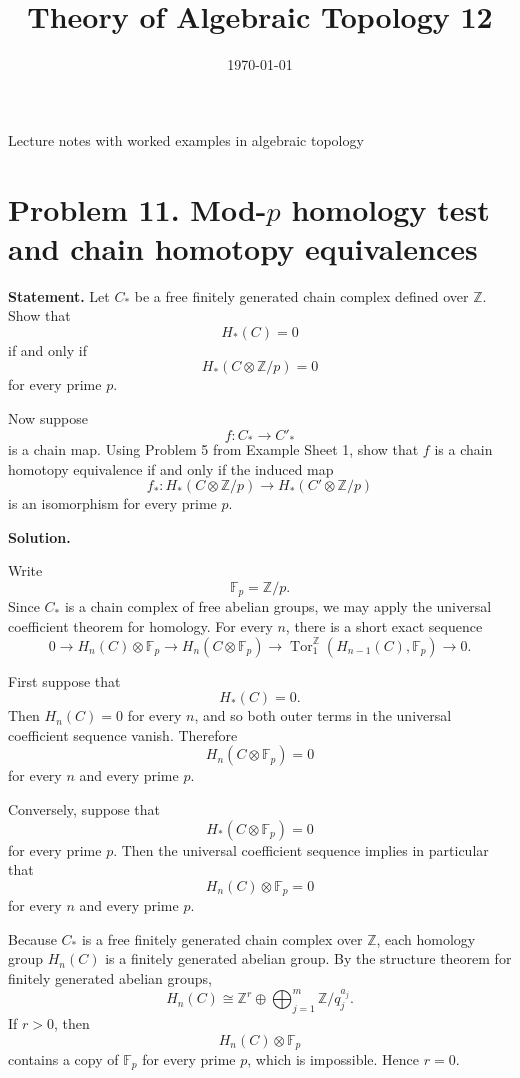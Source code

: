 \documentclass[12pt,a4paper]{article}
\title{\vspace{-1.5em}\bfseries Theory of Algebraic Topology 12}
\author{}
\date{\today}
\theoremstyle{notespace}
\begin{document}
	\maketitle
	\thispagestyle{plain}
		\begin{center}
		\begin{minipage}{0.92\textwidth}
			Lecture notes with worked examples in algebraic topology
		\end{minipage}
	\end{center}
		\tableofcontents
	\clearpage

\section{Problem 11. Mod-\(p\) homology test and chain homotopy equivalences}

\textbf{Statement.}
Let \(C_*\) be a free finitely generated chain complex defined over \(\mathbb Z\). Show that
\[
H_*(C)=0
\]
if and only if
\[
H_*(C\otimes \mathbb Z/p)=0
\]
for every prime \(p\).

Now suppose
\[
f:C_* \longrightarrow C'_*
\]
is a chain map. Using Problem 5 from Example Sheet 1, show that \(f\) is a chain homotopy equivalence if and only if the induced map
\[
f_*:H_*(C\otimes \mathbb Z/p)\longrightarrow H_*(C'\otimes \mathbb Z/p)
\]
is an isomorphism for every prime \(p\).

\textbf{Solution.}

Write
\[
\mathbb F_p=\mathbb Z/p.
\]
Since \(C_*\) is a chain complex of free abelian groups, we may apply the universal coefficient theorem for homology. For every \(n\), there is a short exact sequence
\[
0
\longrightarrow
H_n(C)\otimes \mathbb F_p
\longrightarrow
H_n(C\otimes \mathbb F_p)
\longrightarrow
\operatorname{Tor}_1^{\mathbb Z}(H_{n-1}(C),\mathbb F_p)
\longrightarrow
0.
\]

First suppose that
\[
H_*(C)=0.
\]
Then \(H_n(C)=0\) for every \(n\), and so both outer terms in the universal coefficient sequence vanish. Therefore
\[
H_n(C\otimes \mathbb F_p)=0
\]
for every \(n\) and every prime \(p\).

Conversely, suppose that
\[
H_*(C\otimes \mathbb F_p)=0
\]
for every prime \(p\). Then the universal coefficient sequence implies in particular that
\[
H_n(C)\otimes \mathbb F_p=0
\]
for every \(n\) and every prime \(p\).

Because \(C_*\) is a free finitely generated chain complex over \(\mathbb Z\), each homology group \(H_n(C)\) is a finitely generated abelian group. By the structure theorem for finitely generated abelian groups,
\[
H_n(C)\cong \mathbb Z^r\oplus
\bigoplus_{j=1}^m \mathbb Z/q_j^{a_j}.
\]
If \(r>0\), then
\[
H_n(C)\otimes \mathbb F_p
\]
contains a copy of \(\mathbb F_p\) for every prime \(p\), which is impossible. Hence \(r=0\).
\end{document}
